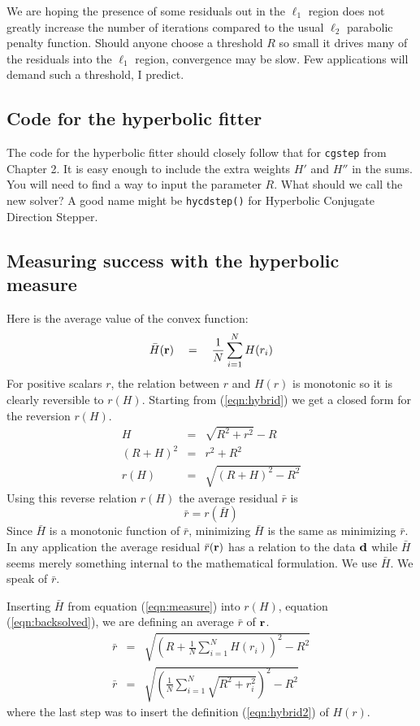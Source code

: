 \par
We are hoping the presence of some residuals out in the $\ell_1$ region
does not greatly increase the number of iterations
compared to the usual $\ell_2$ parabolic penalty function.
Should anyone choose a threshold $R$ so small
it drives many of the residuals into the $\ell_1$ region,
convergence may be slow.
Few applications will demand such a threshold, I predict.


\subsection{Code for the hyperbolic fitter}

The code for the hyperbolic fitter
should closely follow that for
\texttt{cgstep} from Chapter 2.
It is easy enough to include the extra weights $H'$ and $H''$ in the sums.
You will need to find a way to input the parameter $R$.
What should we call the new solver?
A good name might be
\texttt{hycdstep()}
for Hyperbolic Conjugate Direction Stepper.


\subsection{Measuring success with the hyperbolic measure}
\par
Here is the average value of the convex function:
\begin{equation}
\label{eqn:measure}
\bar H(\bold r)
\quad=\quad
\frac{1}{N} \sum_{i=1}^N H(r_i)
\end{equation}
For positive scalars $r$, the relation between $r$ and $H(r)$ is monotonic
so it is clearly reversible to $r(H)$.
Starting from (\ref{eqn:hybrid})
we get a closed form for the reversion $r(H)$.
\begin{eqnarray}
H &=& \sqrt{R^2 + r^2} - R
\label{eqn:hybrid2}
\\
\label{eqn:hypoteneuse}
(R+H)^2 &=& r^2+R^2
\\
\label{eqn:backsolved}
r(H) &=& \sqrt{(R+H)^2 -R^2}
\end{eqnarray}
Using this reverse relation $r(H)$ 
the average residual $\bar r$ is
\begin{equation}
\bar r = r(\bar H)
\end{equation}
Since $\bar H$ is a monotonic function of $\bar r$,
minimizing $\bar H$ is the same as minimizing $\bar r$.
In any application the average residual $\bar r(\bold r)$
has a relation to the data $\bold d$ while $\bar H$
seems merely something internal to the mathematical formulation.
We use $\bar H$.  We speak of $\bar r$.
\par
Inserting $\bar H$ from equation (\ref{eqn:measure})
into $r(H)$, equation (\ref{eqn:backsolved}),
we are defining an average $\bar r$ of $\bold r$.
\begin{eqnarray}
\bar r &=& \sqrt{ \left( R + \frac{1}{N} \sum_{i=1}^N H(r_i)\right)^2 - R^2}
\\
\label{eqn:average}
\bar r &=& \sqrt{ \left( \frac{1}{N} \sum_{i=1}^N \sqrt{R^2+r_i^2}\right)^2 - R^2}
\end{eqnarray}
where the last step was to insert the definition (\ref{eqn:hybrid2}) of $H(r)$.

